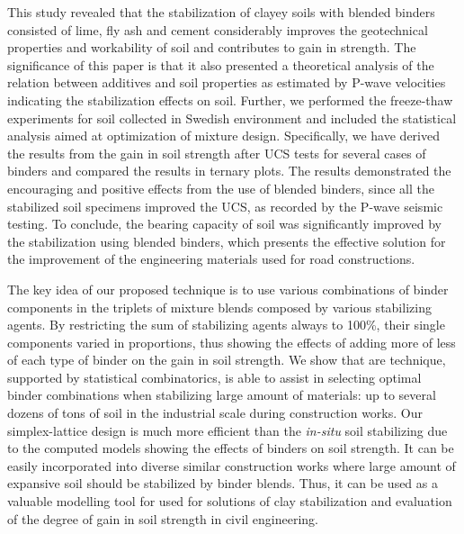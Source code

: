 \documentclass[constrmater,article,submit,pdftex,moreauthors]{Definitions/mdpi}
\begin{document}
This study revealed that the stabilization of clayey soils with blended binders consisted of lime, fly ash and cement considerably improves the geotechnical properties and workability of soil and contributes to gain in strength. The significance of this paper is that it also presented a theoretical analysis of the relation between additives and soil properties as estimated by P-wave velocities indicating the stabilization effects on soil. Further, we performed the freeze-thaw experiments for soil collected in Swedish environment and included the statistical analysis aimed at optimization of mixture design. Specifically, we have derived the results from the gain in soil strength after UCS tests for several cases of binders and compared the results in ternary plots. The results demonstrated the encouraging and positive effects from the use of blended binders, since all the stabilized soil specimens improved the UCS, as recorded by the P-wave seismic testing. To conclude, the bearing capacity of soil was significantly improved by the stabilization using blended binders, which presents the effective solution for the improvement of the engineering materials used for road constructions.

The key idea of our proposed technique is to use various combinations of binder components in the triplets of mixture blends composed by various stabilizing agents. By restricting the sum of stabilizing agents always to 100\%, their single components varied in proportions, thus showing the effects of adding more of less of each type of binder on the gain in soil strength. We show that are technique, supported by statistical combinatorics, is able to assist in selecting optimal binder combinations when stabilizing large amount of materials: up to several dozens of tons of soil in the industrial scale during construction works. Our simplex-lattice design is much more efficient than the \emph{in-situ} soil stabilizing due to the computed models showing the effects of  binders on soil strength. It can be easily incorporated into diverse similar construction works where large amount of expansive soil should be stabilized by binder blends. Thus, it can be used as a valuable modelling tool for used for solutions of clay stabilization and evaluation of the degree of gain in soil strength in civil engineering.

\end{document}
